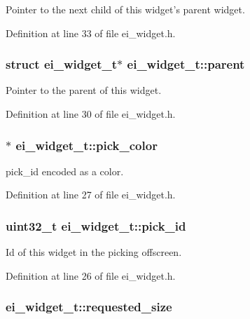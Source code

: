Pointer to the next child of this widget's parent widget. 

Definition at line 33 of file ei\_\-widget.h.\hypertarget{structei__widget__t_adb1b43eda89c8e86d6337c939f1a4473}{
\subsubsection[{parent}]{\setlength{\rightskip}{0pt plus 5cm}struct {\bf ei\_\-widget\_\-t}$\ast$ {\bf ei\_\-widget\_\-t::parent}}}
\label{structei__widget__t_adb1b43eda89c8e86d6337c939f1a4473}


Pointer to the parent of this widget. 

Definition at line 30 of file ei\_\-widget.h.\hypertarget{structei__widget__t_ad1477adf8e6b5cb6a5f11f657fe4781b}{
\subsubsection[{pick\_\-color}]{$\ast$ {\bf ei\_\-widget\_\-t::pick\_\-color}}}
\label{structei__widget__t_ad1477adf8e6b5cb6a5f11f657fe4781b}


pick\_\-id encoded as a color. 

Definition at line 27 of file ei\_\-widget.h.\hypertarget{structei__widget__t_ada7ce878377d653d930a57e175b61182}{
\subsubsection[{pick\_\-id}]{\setlength{\rightskip}{0pt plus 5cm}uint32\_\-t {\bf ei\_\-widget\_\-t::pick\_\-id}}}
\label{structei__widget__t_ada7ce878377d653d930a57e175b61182}


Id of this widget in the picking offscreen. 

Definition at line 26 of file ei\_\-widget.h.\hypertarget{structei__widget__t_ae82b19958b3ec72a855986dffb9b92ea}{
\subsubsection[{requested\_\-size}]{ {\bf ei\_\-widget\_\-t::requested\_\-size}}}
\label{structei__widget__t_ae82b19958b3ec72a855986dffb9b92ea}


